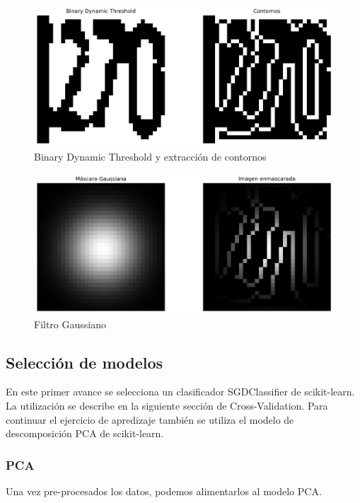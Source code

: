 \documentclass[journal]{IEEEtran}
\begin{document}
\begin{figure}[H]
        \centering
        \includegraphics[width=\linewidth]{figures/row_4_images.png}
        \caption{Binary Dynamic Threshold y extracción de contornos}
        \label{fig:row_4}
\end{figure}

\begin{figure}[H]
        \centering
        \includegraphics[width=\linewidth]{figures/row_5_images.png}
        \caption{Filtro Gaussiano}
        \label{fig:row_5}
\end{figure}

\subsection{Selección de modelos}
En este primer avance se selecciona un clasificador SGDClassifier de scikit-learn.\cite{scikit-learn_sgdclassifier} La utilización se describe en la siguiente sección de Cross-Validation. Para continuar el ejercicio de apredizaje también se utiliza el modelo de descomposición PCA de scikit-learn.\cite{scikit-learn_pca} 

\subsubsection{PCA}
Una vez pre-procesados los datos, podemos alimentarlos al modelo PCA.
\end{document}
